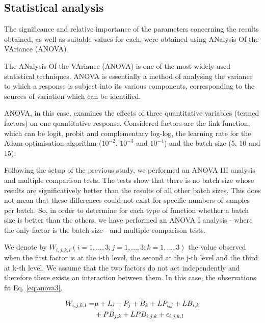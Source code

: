 \documentclass[10pt, a4paper, titlepage, twocolumn]{article}
\begin{document}
	\subsection{Statistical analysis}
	The significance and relative importance of the parameters concerning the results obtained, as well as suitable values for each, were obtained using ANalysis Of the VAriance (ANOVA)
	
	The ANalysis Of the VAriance (ANOVA) \cite{miller1997beyond} is one of the most widely used statistical techniques. ANOVA is essentially a method of analysing the variance to which a response is subject into its various components, corresponding to the sources of variation which can be identified.
	
	ANOVA, in this case, examines the effects of three quantitative variables (termed factors) on one quantitative response. Considered factors are the link function, which can be logit, probit and complementary log-log, the learning rate for the Adam optimisation algorithm ($10^{-2}$, $10^{-3}$ and $10^{-4}$) and the batch size (5, 10 and 15).
	
	Following the setup of the previous study, we performed an ANOVA III analysis and multiple comparison tests. The tests show that there is no batch size whose results are significatively better than the results of all other batch sizes. This does not mean that these differences could not exist for specific numbers of samples per batch. So, in order to determine for each type of function whether a batch size is better than the others, we have performed an ANOVA I analysis - where the only factor is the batch size - and multiple comparison tests.
	
	We denote by $W_{i,j,k,l}(i=1, ..., 3; j = 1, ..., 3; k = 1, ..., 3)$ the value observed when the first factor is at the i-th level, the second at the j-th level and the third at k-th level. We assume that the two factors do not act independently and therefore there exists an interaction between them. In this case, the observations fit Eq. \ref{eq:anova3}.
	
	\begin{equation}
	\begin{aligned}
	\footnotesize
	W_{i,j,k,l} = & \mu + L_i + P_j + B_k + LP_{i,j} + LB_{i,k} \\& + PB_{j,k} + LPB_{i,j,k} + \epsilon_{i,j,k,l}
	\label{eq:anova3}
	\end{aligned}
	\end{equation}
	
\end{document}
